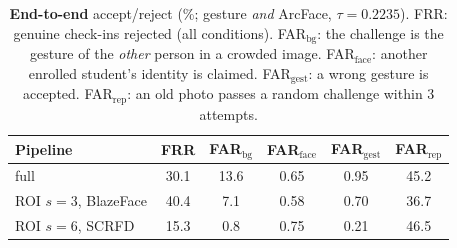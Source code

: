 \begin{table}[t]
\centering
\footnotesize
\setlength{\tabcolsep}{2.2pt}
\begin{tabular}{lccccc}
\toprule
Pipeline & FRR & FAR$_\text{bg}$ & FAR$_\text{face}$ & FAR$_\text{gest}$ & FAR$_\text{rep}$ \\
\midrule
full & 30.1 & 13.6 & 0.65 & 0.95 & 45.2 \\
ROI $s{=}3$, BlazeFace & 40.4 & 7.1 & 0.58 & 0.70 & 36.7 \\
ROI $s{=}6$, SCRFD & 15.3 & 0.8 & 0.75 & 0.21 & 46.5 \\
\bottomrule
\end{tabular}
\vspace{-1mm}
\caption{\textbf{End-to-end} accept/reject (\%; gesture \emph{and} ArcFace, $\tau{=}0.2235$). FRR: genuine check-ins rejected (all conditions). FAR$_\text{bg}$: the challenge is the gesture of the \emph{other} person in a crowded image. FAR$_\text{face}$: another enrolled student's identity is claimed. FAR$_\text{gest}$: a wrong gesture is accepted. FAR$_\text{rep}$: an old photo passes a random challenge within 3 attempts.}
\label{tab:sec}
\vspace{-3mm}
\end{table}
